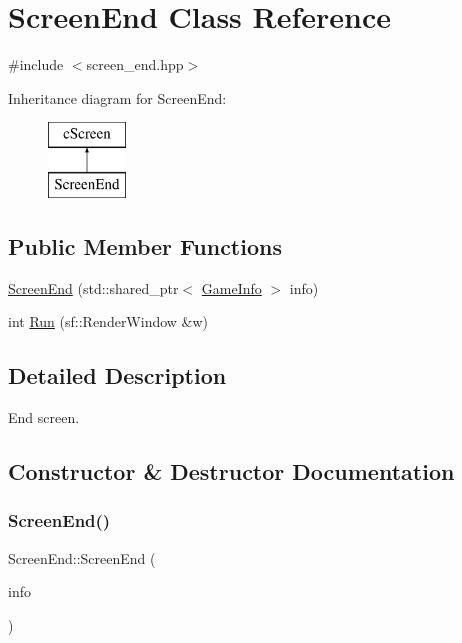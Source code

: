 \hypertarget{classScreenEnd}{}\section{Screen\+End Class Reference}
\label{classScreenEnd}


{\ttfamily \#include $<$screen\+\_\+end.\+hpp$>$}

Inheritance diagram for Screen\+End\+:\begin{figure}[H]
\begin{center}
\leavevmode
\includegraphics[height=2.000000cm]{classScreenEnd}
\end{center}
\end{figure}
\subsection*{Public Member Functions}
\begin{DoxyCompactItemize}
\item 
\hyperlink{classScreenEnd_a19ee749722201d3a47eb80729cdb176c}{Screen\+End} (std\+::shared\+\_\+ptr$<$ \hyperlink{classGameInfo}{Game\+Info} $>$ info)
\item 
int \hyperlink{classScreenEnd_a3582fcab70f5568fcdc187feeb1383ad}{Run} (sf\+::\+Render\+Window \&w)
\end{DoxyCompactItemize}


\subsection{Detailed Description}
End screen. 

\subsection{Constructor \& Destructor Documentation}
\hypertarget{classScreenEnd_a19ee749722201d3a47eb80729cdb176c}{}\label{classScreenEnd_a19ee749722201d3a47eb80729cdb176c} 
\subsubsection{\texorpdfstring{Screen\+End()}{ScreenEnd()}}
{\footnotesize\ttfamily Screen\+End\+::\+Screen\+End (\begin{DoxyParamCaption}\item[{std\+::shared\+\_\+ptr$<$ \hyperlink{classGameInfo}{Game\+Info} $>$}]{info }\end{DoxyParamCaption})\hspace{0.3cm}{\ttfamily [inline]}}

